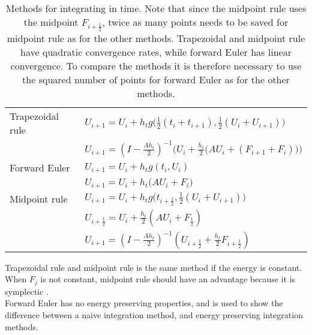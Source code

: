 \begin{table}
\begin{tabular}{l l}
	Trapezoidal rule \cite{trapezoidal} & $U_{i+1} = U_{i}+h_t g \Big( \frac{1}{2}(t_i+t_{i+1}),\frac{1}{2}(U_i+U_{i+1}) \Big)$
	\\ & $U_{i+1} = (I- \frac{A h_t}{2}) ^{-1} \Big(  U_i + \frac{h_t}{2} \big( A U_i+(F_{i+1}+F_i) \big)  \Big) $\\
\hline	
	Forward Euler \cite{forwardeuler} & $ U_{i+1} = U_i + h_t g ( t_i, U_i ) $ \\ & $ U_{i+1} = U_i + h_t \big( A U_i + F_i \big) $ \\
	\hline
	Midpoint rule \cite{midpoint} & $U_{i+1} = U_i + h_t g \Big(  t_{i+\frac{1}{2}} , \frac{1}{2}(U_i + U_{i+1})    \Big) $ \\ & 
	$U_{i+\frac{1}{2}} = U_i + \frac{h_t}{2} ( A U_i + F_{\frac{1}{2}} )$ \\ &
    $U_{i+1} = (I-\frac{A h_t}{2}) ^{-1} (U_{i+\frac{1}{2}} + \frac{h_t}{2} F_{i+ \frac{1}{2}})$
    
    
\end{tabular}

\caption{Methods for integrating in time. Note that since the midpoint rule uses the midpoint $F_{i+\frac{1}{2}}$, twice as many points needs to be saved for midpoint rule as for the other methods. Trapezoidal and midpoint rule have quadratic convergence rates, while forward Euler has linear convergence. To compare the methods it is therefore necessary to use the squared number of points for forward Euler as for the other methods.} 
\label{tab:intmet}
\end{table}
Trapezoidal rule and midpoint rule is the same method if the energy is constant. When $F_j$  is not constant, midpoint rule should have an advantage because it is symplectic \cite{!!!!}. \\

Forward Euler has no energy preserving properties, and is used to show the difference between a naive integration method, and energy preserving integration methods. \\

